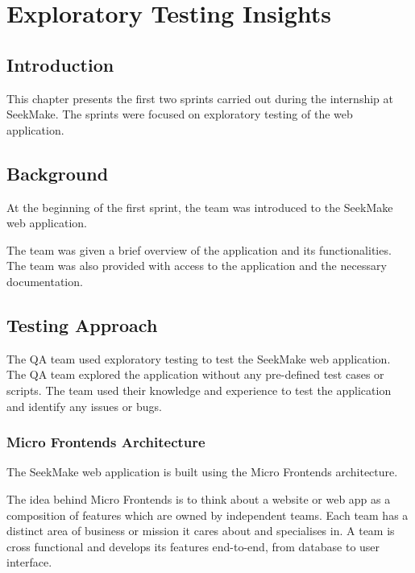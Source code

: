 \chapter{Exploratory Testing Insights}

\section{Introduction}
This chapter presents the first two sprints carried out during the internship at SeekMake. The sprints were focused on exploratory testing of the web application.

\section{Background}

At the beginning of the first sprint, the team was introduced to the SeekMake web application.

The team was given a brief overview of the application and its functionalities. The team was also provided with access to the application and the necessary documentation.

\section{Testing Approach}
The QA team used exploratory testing to test the SeekMake web application. The QA team explored the application without any pre-defined test cases or scripts. The team used their knowledge and experience to test the application and identify any issues or bugs.

\subsection{Micro Frontends Architecture}

The SeekMake web application is built using the Micro Frontends architecture.

The idea behind Micro Frontends is to think about a website or web app as a composition of features which are owned by independent teams. Each team has a distinct area of business or mission it cares about and specialises in. A team is cross functional and develops its features end-to-end, from database to user interface. \cite{microfrontends}

